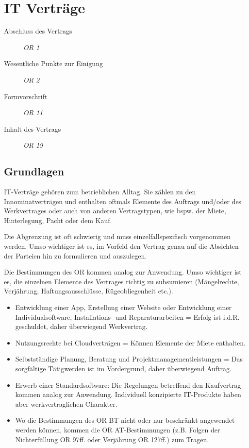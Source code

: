 \chapter{IT Verträge}

\begin{description}
  \item[Abschluss des Vertrags] \textit{OR 1}
  \item[Wesentliche Punkte zur Einigung] \textit{OR 2} 
  \item[Formvorschrift] \textit{OR 11} 
  \item[Inhalt des Vertrags] \textit{OR 19} 
\end{description}

\section{Grundlagen}

IT-Verträge gehören zum betrieblichen Alltag. Sie zählen zu den Innominatverträgen und enthalten oftmals Elemente des Auftrags und/oder des Werkvertrages oder auch von anderen Vertragstypen, wie bspw. der Miete, Hinterlegung, Pacht oder dem Kauf.

Die Abgrenzung ist oft schwierig und muss einzelfallspezifisch vorgenommen werden. Umso wichtiger ist es, im Vorfeld den Vertrag genau auf die Absichten der Parteien hin zu formulieren und auszulegen.

Die Bestimmungen des OR kommen analog zur Anwendung. Umso wichtiger ist es, die einzelnen Elemente des Vertrages richtig zu subsumieren (Mängelrechte, Verjährung, Haftungsausschlüsse, Rügeobliegenheit etc.).
\begin{itemize}
  \item Entwicklung einer App, Erstellung einer Website oder Entwicklung einer Individualsoftware, Installations- und Reparaturarbeiten = Erfolg ist i.d.R. geschuldet, daher überwiegend Werkvertrag.
  \item Nutzungsrechte bei Cloudverträgen = Können Elemente der Miete enthalten.
  \item Selbstständige Planung, Beratung und Projektmanagementleistungen = Das sorgfältige Tätigwerden ist im Vordergrund, daher überwiegend Auftrag.
  \item Erwerb einer Standardsoftware: Die Regelungen betreffend den Kaufvertrag kommen analog zur   Anwendung. Individuell konzipierte IT-Produkte haben aber werkvertraglichen Charakter.
  \item Wo die Bestimmungen des OR BT nicht oder nur beschränkt angewendet werden können, kommen die   OR AT-Bestimmungen (z.B. Folgen der Nichterfüllung OR 97ff. oder Verjährung OR 127ff.) zum Tragen.
\end{itemize}

